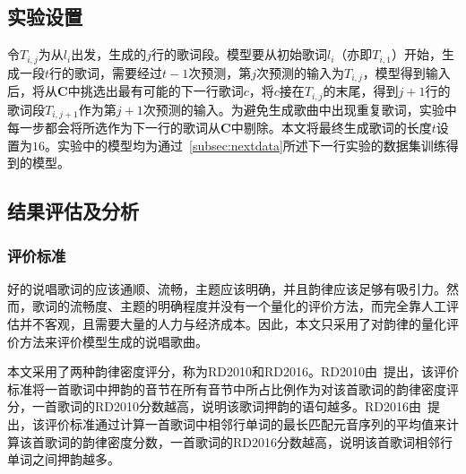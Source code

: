 \subsection{实验设置}
令$T_{i,j}$为从$l_i$出发，生成的$j$行的歌词段。模型要从初始歌词$l_i$（亦即$T_{i, 1}$）开始，生成一段$t$行的歌词，需要经过$t-1$次预测，第$j$次预测的输入为$T_{i, j}$，模型得到输入后，将从$\bm C{}$中挑选出最有可能的下一行歌词$c$，将$c$接在$T_{i, j}$的末尾，得到$j+1$行的歌词段$T_{i, j+1}$作为第$j+1$次预测的输入。为避免生成歌曲中出现重复歌词，实验中每一步都会将所选作为下一行的歌词从$\bm C$中剔除。本文将最终生成歌词的长度$t$设置为$16$。实验中的模型均为通过~\ref{subsec:nextdata}所述下一行实验的数据集训练得到的模型。\par

\subsection{结果评估及分析}
\subsubsection{评价标准}
好的说唱歌词的应该通顺、流畅，主题应该明确，并且韵律应该足够有吸引力。然而，歌词的流畅度、主题的明确程度并没有一个量化的评价方法，而完全靠人工评估并不客观，且需要大量的人力与经济成本。因此，本文只采用了对韵律的量化评价方法来评价模型生成的说唱歌曲。\par

本文采用了两种韵律密度评分，称为RD2010和RD2016。RD2010由~\autocite{hirjee2010using}提出，该评价标准将一首歌词中押韵的音节在所有音节中所占比例作为对该首歌词的韵律密度评分，一首歌词的RD2010分数越高，说明该歌词押韵的语句越多。RD2016由~\autocite{Malmi2016dopelearning}提出，该评价标准通过计算一首歌词中相邻行单词的最长匹配元音序列的平均值来计算该首歌词的韵律密度分数，一首歌词的RD2016分数越高，说明该首歌词相邻行单词之间押韵越多。\par

